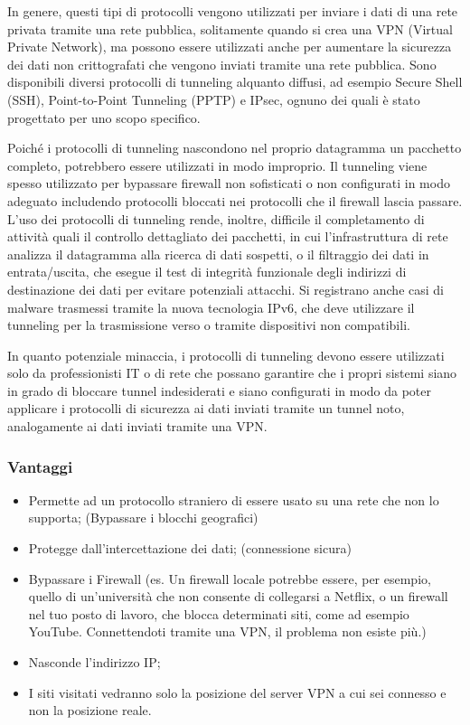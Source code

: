 In genere, questi tipi di protocolli vengono utilizzati per inviare i dati di una rete privata tramite una rete pubblica, solitamente quando si crea una VPN (Virtual Private Network), ma possono essere utilizzati anche per aumentare la sicurezza dei dati non crittografati che vengono inviati tramite una rete pubblica. Sono disponibili diversi protocolli di tunneling alquanto diffusi, ad esempio Secure Shell (SSH), Point-to-Point Tunneling (PPTP) e IPsec, ognuno dei quali è stato progettato per uno scopo specifico.

Poiché i protocolli di tunneling nascondono nel proprio datagramma un pacchetto completo, potrebbero essere utilizzati in modo improprio. Il tunneling viene spesso utilizzato per bypassare firewall non sofisticati o non configurati in modo adeguato includendo protocolli bloccati nei protocolli che il firewall lascia passare. L'uso dei protocolli di tunneling rende, inoltre, difficile il completamento di attività quali il controllo dettagliato dei pacchetti, in cui l'infrastruttura di rete analizza il datagramma alla ricerca di dati sospetti, o il filtraggio dei dati in entrata/uscita, che esegue il test di integrità funzionale degli indirizzi di destinazione dei dati per evitare potenziali attacchi. Si registrano anche casi di malware trasmessi tramite la nuova tecnologia IPv6, che deve utilizzare il tunneling per la trasmissione verso o tramite dispositivi non compatibili.

In quanto potenziale minaccia, i protocolli di tunneling devono essere utilizzati solo da professionisti IT o di rete che possano garantire che i propri sistemi siano in grado di bloccare tunnel indesiderati e siano configurati in modo da poter applicare i protocolli di sicurezza ai dati inviati tramite un tunnel noto, analogamente ai dati inviati tramite una VPN.

\subsubsection{Vantaggi}
\begin{itemize}
    \item Permette ad un protocollo straniero di essere usato su una rete che non lo supporta; (Bypassare i blocchi geografici)
    \item Protegge dall'intercettazione dei dati; (connessione sicura)
    \item Bypassare i Firewall (es. Un firewall locale potrebbe essere, per esempio, quello di un’università che non consente di collegarsi a Netflix, o un firewall nel tuo posto di lavoro, che blocca determinati siti, come ad esempio YouTube. Connettendoti tramite una VPN, il problema non esiste più.)
    \item Nasconde l’indirizzo IP;
    \item I siti visitati vedranno solo la posizione del server VPN a cui sei connesso e non la posizione reale.
\end{itemize}


